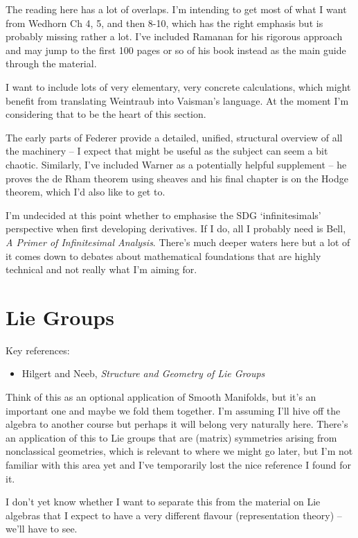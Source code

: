 \documentclass[article]{article}
\begin{document}
The reading here has a lot of overlaps. I'm intending to get most of what I want from Wedhorn Ch 4, 5, and then 8-10, which has the right emphasis but is probably missing rather a lot. I've included Ramanan for his rigorous approach and may jump to the first 100 pages or so of his book instead as the main guide through the material.

I want to include lots of very elementary, very concrete calculations, which might benefit from translating Weintraub into Vaisman's language. At the moment I'm considering that to be the heart of this section.

The early parts of Federer provide a detailed, unified, structural overview of all the machinery -- I expect that might be useful as the subject can seem a bit chaotic. Similarly, I've included Warner as a potentially helpful supplement -- he proves the de Rham theorem using sheaves and his final chapter is on the Hodge theorem, which I'd also like to get to.

I'm undecided at this point whether to emphasise the SDG `infinitesimals' perspective when first developing derivatives. If I do, all I probably need is Bell, \textit{A Primer of Infinitesimal Analysis}. There's much deeper waters here but a lot of it comes down to debates about mathematical foundations that are highly technical and not really what I'm aiming for.

\section{Lie Groups}
Key references:
\begin{itemize}
	\item{Hilgert and Neeb, \textit{Structure and Geometry of Lie Groups}}
\end{itemize}

Think of this as an optional application of Smooth Manifolds, but it's an important one and maybe we fold them together. I'm assuming I'll hive off the algebra to another course but perhaps it will belong very naturally here. There's an application of this to Lie groups that are (matrix) symmetries arising from nonclassical geometries, which is relevant to where we might go later, but I'm not familiar with this area yet and I've temporarily lost the nice reference I found for it. 

I don't yet know whether I want to separate this from the material on Lie algebras that I expect to have a very different flavour (representation theory) -- we'll have to see.
\end{document}
